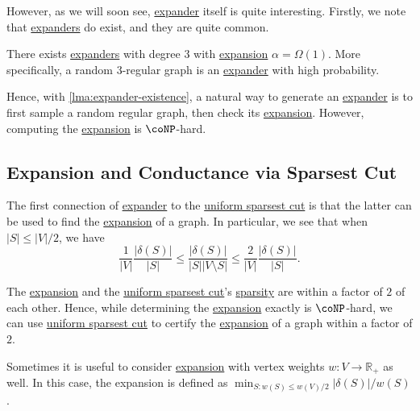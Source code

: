 However, as we will soon see, \hyperref[def:expander]{expander} itself is quite interesting. Firstly, we note that \hyperref[def:expander]{expanders} do exist, and they are quite common.

\begin{lemma}\label{lma:expander-existence}
	There exists \hyperref[def:expander]{expanders} with degree \(3\) with \hyperref[def:expansion]{expansion} \(\alpha = \Omega (1)\). More specifically, a random \(3\)-regular graph is an \hyperref[def:expander]{expander} with high probability.
\end{lemma}

Hence, with \autoref{lma:expander-existence}, a natural way to generate an \hyperref[def:expander]{expander} is to first sample a random regular graph, then check its \hyperref[def:expansion]{expansion}. However, computing the \hyperref[def:expansion]{expansion} is \(\coNP\)-hard.

\subsection{Expansion and Conductance via Sparsest Cut}
The first connection of \hyperref[def:expander]{expander} to the \hyperref[prb:sparsest-cut]{uniform sparsest cut} is that the latter can be used to find the \hyperref[def:expansion]{expansion} of a graph. In particular, we see that when \(\lvert S \rvert \leq \lvert V \rvert / 2\), we have
\[
	\frac{1}{\lvert V \rvert } \frac{\lvert \delta (S) \rvert }{\lvert S \rvert }
	\leq \frac{\lvert \delta (S) \rvert }{\lvert S \rvert \lvert V \setminus S \rvert }
	\leq \frac{2}{\lvert V \rvert } \frac{\lvert \delta (S) \rvert }{\lvert S \rvert }.
\]

\begin{remark}\label{rmk:expansion-sparsity}
	The \hyperref[def:expansion]{expansion} and the \hyperref[prb:sparsest-cut]{uniform sparsest cut}'s \hyperref[def:sparsity]{sparsity} are within a factor of \(2\) of each other. Hence, while determining the \hyperref[def:expansion]{expansion} exactly is \(\coNP\)-hard, we can use \hyperref[prb:sparsest-cut]{uniform sparsest cut} to certify the \hyperref[def:expansion]{expansion} of a graph within a factor of \(2\).
\end{remark}

Sometimes it is useful to consider \hyperref[def:expansion]{expansion} with vertex weights \(w \colon V \to \mathbb{R} _+\) as well. In this case, the expansion is defined as \(\min _{S \colon w(S) \leq w(V) / 2} \lvert \delta (S) \rvert / w(S)\).

